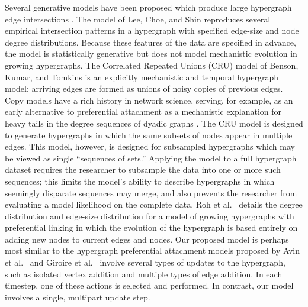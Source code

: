 Several generative models have been proposed which produce large hypergraph edge intersections \cite{leeSurveyHypergraphMining2024}. 
The model of Lee, Choe, and Shin \cite{leeHowHyperedgesOverlap2021} reproduces several empirical intersection patterns in a hypergraph with specified edge-size and node degree distributions. 
Because these features of the data are specified in advance, the model is statistically generative but does not model mechanistic evolution in growing hypergraphs. 
The Correlated Repeated Unions (CRU) model of Benson, Kumar, and Tomkins \cite{bensonSequencesSets2018} is an explicitly mechanistic and temporal hypergraph model: arriving edges are formed as unions of noisy copies of previous edges. 
Copy models have a rich history in network science, serving, for example, as an early alternative to preferential attachment as a mechanistic explanation for heavy tails in the degree sequences of dyadic graphs \cite{kleinbergWebGraphMeasurements1999,soleModelLargeScaleProteome2002,vazquezModelingProteinInteraction2003,newman2018networks}. 
The CRU model is designed to generate hypergraphs in which the same subsets of nodes appear in multiple edges. 
This model, however, is designed for subsampled hypergraphs which may be viewed as single ``sequences of sets.''
Applying the model to a full hypergraph dataset requires the researcher to subsample the data into one or more such sequences; 
this limits the model's ability to describe hypergraphs in which seemingly disparate sequences may merge, and also prevents the researcher from evaluating a model likelihood on the complete data. 
Roh et al.~\cite{rohGrowingHypergraphsPreferential2023} details the degree distribution and edge-size distribution for a model of growing hypergraphs with preferential linking in which the evolution of the hypergraph is based entirely on adding new nodes to current edges and nodes. 
Our proposed model is perhaps most similar to the hypergraph preferential attachment models proposed by Avin et al.~\cite{avinRandomPreferentialAttachment2019} and Giroire et al.~\cite{giroirePreferentialAttachmentHypergraph2022} involve several types of updates to the hypergraph, such as isolated vertex addition and multiple types of edge addition. 
In each timestep, one of these actions is selected and performed. 
In contrast, our model involves a single, multipart update step. 


